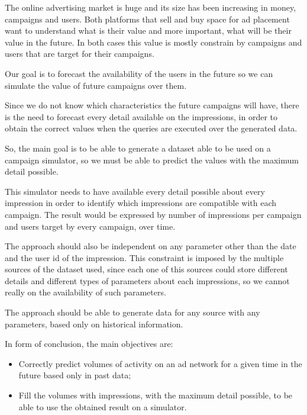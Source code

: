 The online advertising market is huge and its size has been increasing in money,
campaigns and users. Both platforms that sell and buy space for ad placement
want to understand what is their value and more important, what will be their
value in the future. In both cases this value is mostly constrain by campaigns
and users that are target for their campaigns.

Our goal is to forecast the availability of the users in the future so we can
simulate the value of future campaigns over them.

Since we do not know which characteristics the future campaigns will have, there
is the need to forecast every detail available on the impressions, in order to
obtain the correct values when the queries are executed over the generated data.

So, the main goal is to be able to generate a dataset able to be used on a campaign
simulator, so we must be able to predict the values with the maximum detail
possible.

This simulator needs to have available every detail possible about every
impression in order to identify which impressions are compatible with each
campaign. The result would be expressed by number of impressions per campaign and
users target by every campaign, over time.

The approach should also be independent on any parameter other than the
date and the user id of the impression.
This constraint is imposed by the multiple sources of the dataset used, since
each one of this sources could store different details and different types of
parameters about each impressions, so we cannot really on the availability of
such parameters.

The approach should be able to generate data for any source
with any parameters, based only on historical information.

In form of conclusion, the main objectives are:
\begin{itemize}
\item Correctly predict volumes of activity on an ad network for a given time in
  the future based only in past data;
\item Fill the volumes with impressions, with the maximum detail possible, to be
  able to use the obtained result on a simulator.
\end{itemize}


